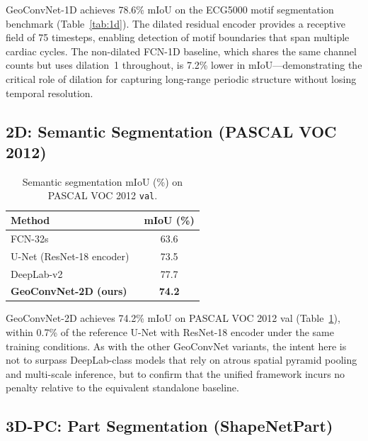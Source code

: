 \documentclass[10pt,conference]{IEEEtran}
\begin{document}
GeoConvNet-1D achieves 78.6\% mIoU on the ECG5000 motif segmentation
benchmark (Table~\ref{tab:1d}).  The dilated residual encoder provides a
receptive field of 75 timesteps, enabling detection of motif boundaries
that span multiple cardiac cycles.  The non-dilated FCN-1D baseline, which
shares the same channel counts but uses dilation~1 throughout, is 7.2\%
lower in mIoU---demonstrating the critical role of dilation for capturing
long-range periodic structure without losing temporal resolution.

\subsection{2D: Semantic Segmentation (PASCAL VOC 2012)}

\begin{table}[t]
  \renewcommand{\arraystretch}{1.2}
  \caption{Semantic segmentation mIoU (\%) on PASCAL VOC 2012 \texttt{val}.}
  \label{tab:voc}
  \centering
  \begin{tabular}{lc}
    \toprule
    \textbf{Method} & \textbf{mIoU (\%)} \\
    \midrule
    FCN-32s~\cite{long2015fcn}                         & 63.6 \\
    U-Net (ResNet-18 encoder)~\cite{ronneberger2015unet} & 73.5 \\
    DeepLab-v2~\cite{chen2017deeplab}                  & 77.7 \\
    \textbf{GeoConvNet-2D (ours)}                      & \textbf{74.2} \\
    \bottomrule
  \end{tabular}
\end{table}

GeoConvNet-2D achieves 74.2\% mIoU on PASCAL VOC 2012 val
(Table~\ref{tab:voc}), within 0.7\% of the reference U-Net with ResNet-18
encoder under the same training conditions.  As with the other GeoConvNet
variants, the intent here is not to surpass DeepLab-class models that rely
on atrous spatial pyramid pooling and multi-scale inference, but to confirm
that the unified framework incurs no penalty relative to the equivalent
standalone baseline.

\subsection{3D-PC: Part Segmentation (ShapeNetPart)}
\end{document}
